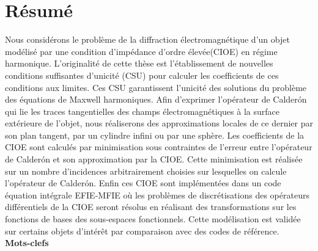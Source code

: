\thispagestyle{empty}
\begin{center}
\Large
\textbf{\doctitlefr}
\end{center}
\section*{Résumé}
Nous considérons le problème de la diffraction électromagnétique d'un objet modélisé par une condition d'impédance d'ordre élevée(CIOE) en régime harmonique.
L'originalité de cette thèse est l'établissement de nouvelles conditions suffisantes d'unicité (CSU) pour calculer les coefficients de ces conditions aux limites. Ces CSU garantissent l'unicité des solutions du problème des équations de Maxwell harmoniques.
Afin d'exprimer l'opérateur de Calderón qui lie les traces tangentielles des champs électromagnétiques à la surface extérieure de l'objet, nous réaliserons des approximations locales de ce dernier par son plan tangent, par un cylindre infini ou par une sphère.
Les coefficients de la CIOE sont calculés par minimisation sous contraintes de l'erreur entre l'opérateur de Calderón et son approximation par la CIOE.
Cette minimisation est réalisée sur un nombre d'incidences arbitrairement choisies sur lesquelles on calcule l'opérateur de Calderón.
Enfin ces CIOE sont implémentées dans un code équation intégrale EFIE-MFIE où les problèmes de discrétisations des opérateurs différentiels de la CIOE seront résolus en réalisant des transformations sur les fonctions de bases des sous-espaces fonctionnels.
Cette modélisation est validée sur certains objets d'intérêt par comparaison avec des codes de référence.
\\

\textbf{Mots-clefs}


\dockeywordsfr

\hrulefill
\begin{center}
\Large
\textbf{\doctitleeng}
\end{center}
